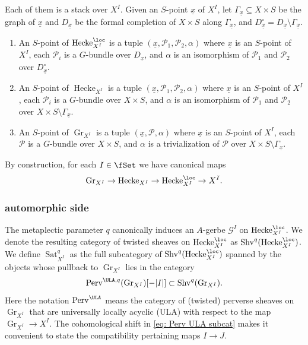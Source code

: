 \documentclass[10pt]{amsart}
\newcommand{\sssec}{\subsubsection}
\theoremstyle{remark}
\newcommand{\ul}{\underline}
\newcommand{\cP}{\mathcal{P}}
\newcommand{\on}{\operatorname}
\newcommand{\cG}{\mathcal{G}}
\newcommand{\Perv}{\on{Perv}}
\newcommand{\Shv}{\on{Shv}}
\newcommand{\Sat}{\on{Sat}}
\newcommand{\Gr}{\on{Gr}}
\newcommand{\Hecke}{\on{Hecke}}
\begin{document}
Each of them is a stack over $X^I$. Given an $S$-point $\ul{x}$ of $X^I$, let $\Gamma_{\ul{x}}\subseteq X\times S$ be the graph of $\ul{x}$ and $D_{\ul{x}}$ be the formal completion of $X\times S$ along $\Gamma_{\ul{x}}$, and $D^{\circ}_{\ul{x}}= D_{\ul{x}}\setminus \Gamma_{\ul{x}}$.
\begin{enumerate}
    \item An $S$-point of $\Hecke^{\loc}_{X^I}$ is a tuple $(\ul{x}, \cP_1,\cP_2, \alpha)$ where $\ul{x}$ is an $S$-point of $X^I$, each $\cP_i$ is a $G$-bundle over $D_{\ul{x}}$, and $\alpha$ is an isomorphism of $\cP_1$ and $\cP_2$ over $D^{\circ}_{\ul{x}}$.
    
    \item An $S$-point of $\Hecke_{X^I}$ is a tuple $(\ul{x}, \cP_1,\cP_2, \alpha)$ where $\ul{x}$ is an $S$-point of $X^I$, each $\cP_i$ is a $G$-bundle over $X\times S$, and $\alpha$ is an isomorphism of $\cP_1$ and $\cP_2$ over $X\times S\setminus \Gamma_{\ul{x}}$.

    \item An $S$-point of $\Gr_{X^I}$ is a tuple $(\ul{x},\cP,\alpha)$ where $\ul{x}$ is an $S$-point of $X^I$, each $\cP$ is a $G$-bundle over $X\times S$, and $\alpha$ is a trivialization of $\cP$ over $X\times S\setminus \Gamma_{\ul{x}}$.
\end{enumerate}
By construction, for each $I\in\fSet$ we have canonical maps \[\Gr_{X^I}\rightarrow\Hecke_{X^I}\rightarrow\Hecke^{\loc}_{X^I}\rightarrow X^I.\]

\sssec{automorphic side}\label{sssec: A side of Satake}
 The metaplectic parameter $q$ canonically induces an $A$-gerbe $\cG^I$ on $\Hecke^{\loc}_{X^I}$. We denote the resulting category of twisted sheaves on $\Hecke^{\loc}_{X^I}$ as $\Shv^q(\Hecke^{\loc}_{X^I})$.
We define $\Sat^q_{X^I}$ as the full subcategory of $\Shv^q(\Hecke^{\loc}_{X^I})$ spanned by the objects whose pullback to $\Gr_{X^I}$ lies in the category
\begin{equation}\label{eq: Perv ULA subcat}
    \Perv^{\ULA,q}(\Gr_{X^I})[-|I|]\subset \Shv^q(\Gr_{X^I}). 
\end{equation}
Here the notation $\Perv^{\ULA}$ means the category of (twisted) perverse sheaves on $\Gr_{X^I}$ that are universally locally acyclic (ULA) with respect to the map $\Gr_{X^I}\rightarrow X^I$. The cohomological shift in \eqref{eq: Perv ULA subcat} makes it convenient to state the compatibility pertaining maps $I\rightarrow J$. 
\medskip
\end{document}
